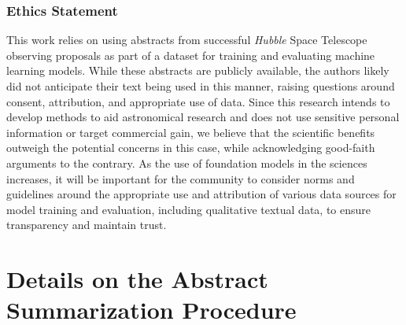 \documentclass{article} %
\newcommand{\hubble}{\emph{Hubble}\xspace}
\begin{document}



\subsubsection*{Ethics Statement}
This work relies on using abstracts from successful \hubble Space Telescope observing proposals as part of a dataset for training and evaluating machine learning models. While these abstracts are publicly available, the authors likely did not anticipate their text being used in this manner, raising questions around consent, attribution, and appropriate use of data. Since this research intends to develop methods to aid astronomical research and does not use sensitive personal information or target commercial gain, we believe that the scientific benefits outweigh the potential concerns in this case, while acknowledging good-faith arguments to the contrary. As the use of foundation models in the sciences increases, it will be important for the community to consider norms and guidelines around the appropriate use and attribution of various data sources for model training and evaluation, including qualitative textual data, to ensure transparency and maintain trust.





\appendix

\section{Details on the Abstract Summarization Procedure}
\end{document}
